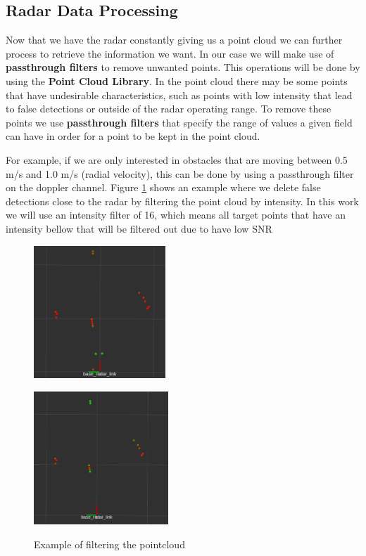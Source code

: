 \subsection{Radar Data Processing}
Now that we have the radar constantly giving us a point cloud we can further process to retrieve the information we want. 
In our case we will make use of \textbf{passthrough filters} to remove unwanted points. This operations will be done by using the \textbf{Point Cloud Library}.
In the point cloud there may be some points that have undesirable characteristics, such as points with low intensity  that lead to false detections or outside of the radar operating range. To remove these points we use \textbf{passthrough filters} that specify the range of values a given field can have in order for a point to be kept in the point cloud. 

For example, if we are only interested in obstacles that are moving between 0.5 m/s and 1.0 m/s (radial velocity), this can be done by using a passthrough filter on the doppler channel.
Figure \ref{fig:filters} shows an example where we delete false detections close to the radar by filtering the point cloud by intensity. In this work we will use an intensity filter of 16, which means all target points that have an intensity bellow that will be filtered out due to have low \ac{SNR}


\begin{figure}[ht!] 
    \begin{minipage}[b]{.49\linewidth}
        \includegraphics[height=5cm,width=\linewidth]{imgs/chapter4/notfilt.png}
        \label{fig:nonfilt}
    \end{minipage}
    \begin{minipage}[b]{.49\linewidth}
        \includegraphics[height=5cm,width=\linewidth]{imgs/chapter4/filt.png}
        \label{fig:filt}
    \end{minipage}
    \caption{Example of filtering the pointcloud}
    \label{fig:filters}
\end{figure}


